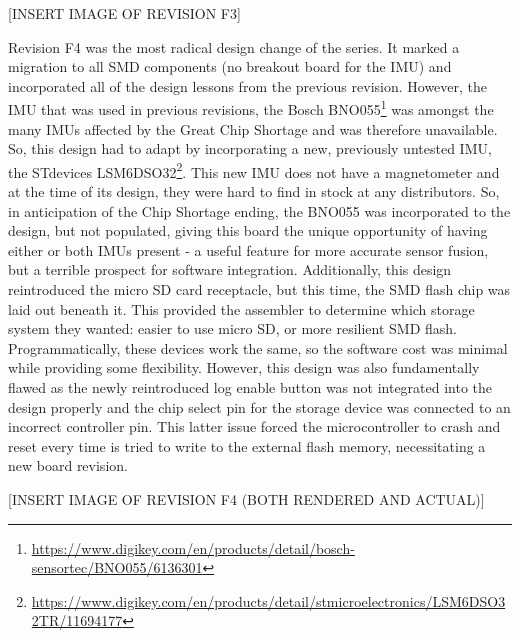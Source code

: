 [INSERT IMAGE OF REVISION F3]

Revision F4 was the most radical design change of the series.
It marked a migration to all SMD components (no breakout board for the IMU) and incorporated all of the design lessons from the previous revision.
However, the IMU that was used in previous revisions, the Bosch BNO055\footnote{\url{https://www.digikey.com/en/products/detail/bosch-sensortec/BNO055/6136301}} was amongst the many IMUs affected by the Great Chip Shortage and was therefore unavailable.
So, this design had to adapt by incorporating a new, previously untested IMU, the STdevices LSM6DSO32\footnote{\url{https://www.digikey.com/en/products/detail/stmicroelectronics/LSM6DSO32TR/11694177}}.
This new IMU does not have a magnetometer and at the time of its design, they were hard to find in stock at any distributors.
So, in anticipation of the Chip Shortage ending, the BNO055 was incorporated to the design, but not populated, giving this board the unique opportunity of having either or both IMUs present - a useful feature for more accurate sensor fusion, but a terrible prospect for software integration.
Additionally, this design reintroduced the micro SD card receptacle, but this time, the SMD flash chip was laid out beneath it.
This provided the assembler to determine which storage system they wanted: easier to use micro SD, or more resilient SMD flash.
Programmatically, these devices work the same, so the software cost was minimal while providing some flexibility.
However, this design was also fundamentally flawed as the newly reintroduced log enable button was not integrated into the design properly and the chip select pin for the storage device was connected to an incorrect controller pin.
This latter issue forced the microcontroller to crash and reset every time is tried to write to the external flash memory, necessitating a new board revision.

[INSERT IMAGE OF REVISION F4 (BOTH RENDERED AND ACTUAL)]

